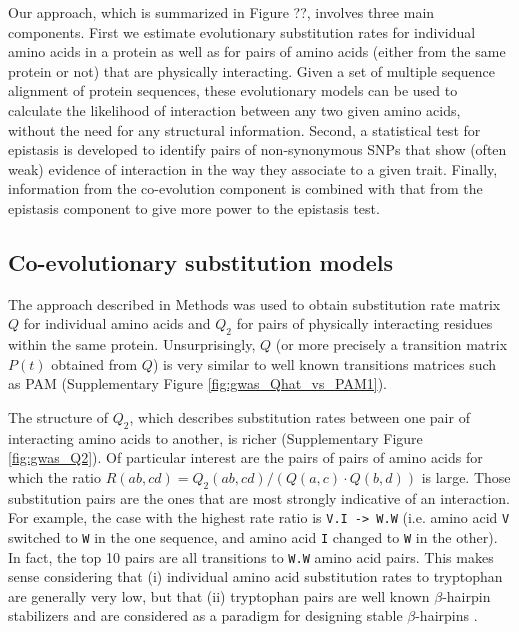 Our approach, which is summarized in Figure ??, involves three main components. First we estimate evolutionary substitution rates for individual amino acids in a protein as well as for pairs of amino acids (either from the same protein or not) that are physically interacting. Given a set of multiple sequence alignment of protein sequences, these evolutionary models can be used to calculate the likelihood of interaction between any two given amino acids, without the need for any structural information. Second, a statistical test for epistasis is developed to identify pairs of non-synonymous SNPs that show (often weak) evidence of interaction in the way they associate to a given trait. Finally, information from the co-evolution component is combined with that from the epistasis component to give more power to the epistasis test.
 
\subsection{Co-evolutionary substitution models}

The approach described in Methods was used to obtain substitution rate matrix $Q$ for individual amino acids and $Q_2$ for pairs of physically interacting residues within the same protein. Unsurprisingly, $Q$ (or more precisely a transition matrix $P(t)$ obtained from $Q$) is very similar to well known transitions matrices such as PAM \cite{dayhoff1978model} (Supplementary Figure \ref{fig:gwas_Qhat_vs_PAM1}).

The structure of $Q_2$, which describes substitution rates between one pair of interacting amino acids to another, is richer (Supplementary Figure \ref{fig:gwas_Q2}). Of particular interest are the pairs of pairs of amino acids for which the ratio $R(ab,cd) = Q_2 (ab, cd) / ( Q(a,c) \cdot Q(b,d) )$ is large. Those substitution pairs are the ones that are most strongly indicative of an interaction. 
For example, the case with the highest rate ratio is \texttt{V.I -> W.W} (i.e. amino acid \texttt{V} switched to \texttt{W} in the one sequence, and amino acid \texttt{I} changed to \texttt{W} in the other). In fact, the top 10 pairs are all transitions to \texttt{W.W} amino acid pairs. This makes sense considering that (i) individual amino acid substitution rates to tryptophan are generally very low, but that (ii) tryptophan pairs are well known $\beta$-hairpin stabilizers and are considered as a paradigm for designing stable $\beta$-hairpins \cite{santiveri2010tryptophan}.

